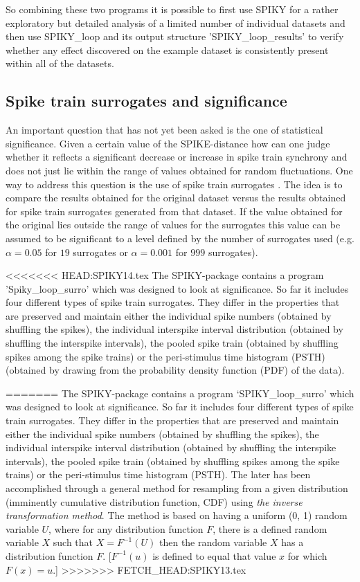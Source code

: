 \documentclass[10pt,twocolumn]{elsart5p}
\begin{document}
So combining these two programs it is possible to first use SPIKY for a rather exploratory but detailed analysis of a limited number of individual datasets and then use SPIKY\_loop and its output structure 'SPIKY\_loop\_results' to verify whether any effect discovered on the example dataset is consistently present within all of the datasets.


\subsection{\label{ss:Spike-train-surrogates} Spike train surrogates and significance}

An important question that has not yet been asked is the one of statistical significance. Given a certain value of the SPIKE-distance how can one judge whether it reflects a significant decrease or increase in spike train synchrony and does not just lie within the range of values obtained for random fluctuations. One way to address this question is the use of spike train surrogates \citep{Kass05, Gruen09, Louis10}. The idea is to compare the results obtained for the original dataset versus the results obtained for spike train surrogates generated from that dataset. If the value obtained for the original lies outside the range of values for the surrogates this value can be assumed to be significant to a level defined by the number of surrogates used (e.g. $\alpha = 0.05$ for $19$ surrogates or $\alpha = 0.001$ for $999$ surrogates).

<<<<<<< HEAD:SPIKY14.tex
The SPIKY-package contains a program 'Spiky\_loop\_surro' which was designed to look at significance.
So far it includes four different types of spike train surrogates. They differ in the properties that are preserved and maintain either the individual spike numbers (obtained by shuffling the spikes), the individual interspike interval distribution (obtained by shuffling the interspike intervals), the pooled spike train (obtained by shuffling spikes among the spike trains) or the peri-stimulus time histogram (PSTH) (obtained by drawing from the probability density function (PDF) of the data).

=======
The SPIKY-package contains a program `SPIKY\_loop\_surro' which was designed to look at significance.
So far it includes four different types of spike train surrogates. They differ in the properties that are preserved and maintain either the individual spike numbers (obtained by shuffling the spikes), the individual interspike interval distribution (obtained by shuffling the interspike intervals), the pooled spike train (obtained by shuffling spikes among the spike trains) or the peri-stimulus time histogram (PSTH). The later has been accomplished through a general method for resampling from a given distribution (imminently cumulative distribution function, CDF) using {\it the inverse transformation method}. The method is based on having a uniform (0, 1) random variable $U$, where for any distribution function $F$, there is a defined random variable $X$ such that $X = F^{-1}(U)$ then the random variable $X$ has a distribution function $F$. [$F^{-1}(u)$ is defined to equal that value $x$ for which $F(x) = u.$]
>>>>>>> FETCH_HEAD:SPIKY13.tex
\end{document}
